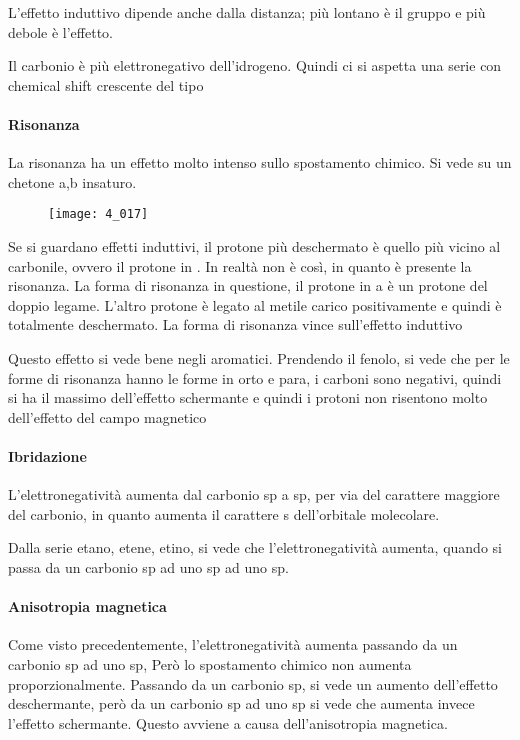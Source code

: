 
L'effetto induttivo dipende anche dalla distanza; più lontano è il gruppo e più debole è l'effetto.

Il carbonio è più elettronegativo dell'idrogeno. Quindi ci si aspetta
una serie con chemical shift crescente del tipo
\begin{center}
     
\end{center}

\paragraph{Risonanza}

La risonanza ha un effetto molto intenso sullo spostamento chimico. Si vede su un
chetone a,b insaturo.

\begin{figure}[H]
  \texttt{[image: 4\_017]}
\end{figure}

Se si guardano effetti induttivi, il protone più deschermato è quello
più vicino al carbonile, ovvero il protone in \alpha.
In realtà non è così, in quanto è presente la risonanza. La forma di
risonanza in questione, il protone in a è un protone del doppio legame.
L'altro protone è legato al metile carico positivamente e quindi è
totalmente deschermato.
La forma di risonanza vince sull'effetto induttivo

Questo effetto si vede bene negli aromatici. Prendendo il fenolo, si
vede che per le forme di risonanza hanno le forme in orto e para, i
carboni sono negativi, quindi si ha il massimo dell'effetto schermante e
quindi i protoni non risentono molto dell'effetto del campo magnetico

\paragraph{Ibridazione}

L'elettronegatività aumenta dal carbonio sp a sp, per via del carattere
maggiore del carbonio, in quanto aumenta il carattere s dell'orbitale molecolare.

Dalla serie etano, etene, etino, si vede che l'elettronegatività
aumenta, quando si passa da un carbonio sp ad uno sp ad uno sp.

\paragraph{Anisotropia magnetica}
Come visto precedentemente, l'elettronegatività aumenta passando da un carbonio sp ad uno sp, Però lo spostamento chimico non aumenta proporzionalmente.
Passando da un carbonio sp, si vede un aumento dell'effetto deschermante, però da un carbonio sp ad uno sp si vede che aumenta invece l'effetto schermante. Questo avviene a causa dell'anisotropia magnetica.

